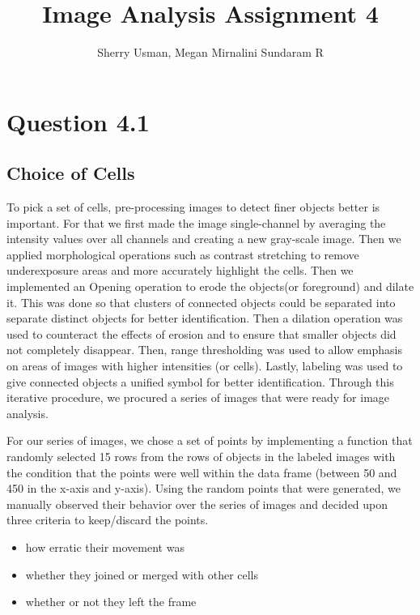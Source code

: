 \documentclass{article}
\title{Image Analysis Assignment 4}
\author{Sherry Usman, Megan Mirnalini Sundaram R}
\begin{document}
\maketitle

\section*{Question 4.1}
\subsection*{Choice of Cells}
\par To pick a set of cells, pre-processing images to detect finer objects better is important. For that we first made the image single-channel by averaging the intensity values over all channels and creating a new gray-scale image. Then we applied morphological operations such as contrast stretching to remove underexposure areas and more accurately highlight the cells. Then we implemented an Opening operation to erode the objects(or foreground) and dilate it. This was done so that clusters of connected objects could be separated into separate distinct objects for better identification. Then a dilation operation was used to counteract the effects of erosion and to ensure that smaller objects did not completely disappear. Then, range thresholding was used to allow emphasis on areas of images with higher intensities (or cells). Lastly, labeling was used to give connected objects a unified symbol for better identification. Through this iterative procedure, we procured a series of images that were ready for image analysis.\newline 
\par For our series of images, we chose a set of points by implementing a function that randomly selected 15 rows from the rows of objects in the labeled images with the condition that the points were well within the data frame (between 50 and 450 in the x-axis and y-axis). Using the random points that were generated, we manually observed their behavior over the series of images and decided upon three criteria to keep/discard the points. 
\begin{itemize}
    \item how erratic their movement was
    \item whether they joined or merged with other cells
    \item whether or not they left the frame
\end{itemize}
\end{document}
